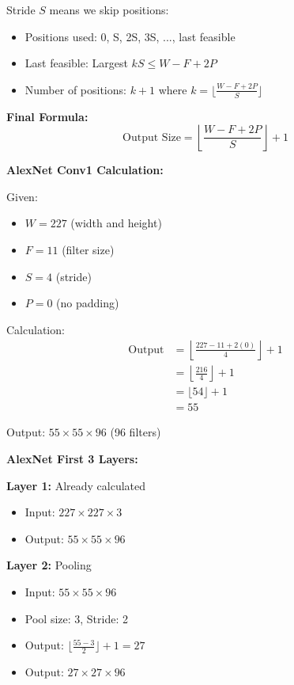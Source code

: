 \documentclass[12pt]{article}
\newcommand{\explanation}[1]{{\color{explanationcolor}#1}}
\begin{document}
\begin{enumerate}[(a)]
{    \explanation{
    Stride $S$ means we skip positions:
    \begin{itemize}
        \item Positions used: 0, S, 2S, 3S, ..., last feasible
        \item Last feasible: Largest $kS \leq W - F + 2P$
        \item Number of positions: $k + 1$ where $k = \lfloor\frac{W - F + 2P}{S}\rfloor$
    \end{itemize}
    
    \textbf{Final Formula:}
    \[\boxed{\text{Output Size} = \left\lfloor\frac{W - F + 2P}{S}\right\rfloor + 1}\]
    }
    
    \textbf{AlexNet Conv1 Calculation:}
    
    \explanation{
    Given:
    \begin{itemize}
        \item $W = 227$ (width and height)
        \item $F = 11$ (filter size)
        \item $S = 4$ (stride)
        \item $P = 0$ (no padding)
    \end{itemize}
    
    Calculation:
    \begin{align}
    \text{Output} &= \left\lfloor\frac{227 - 11 + 2(0)}{4}\right\rfloor + 1\\
    &= \left\lfloor\frac{216}{4}\right\rfloor + 1\\
    &= \lfloor 54 \rfloor + 1\\
    &= 55
    \end{align}
    
    Output: $55 \times 55 \times 96$ (96 filters)
    }
    
    \textbf{AlexNet First 3 Layers:}
    
    \explanation{
    \textbf{Layer 1:} Already calculated
    \begin{itemize}
        \item Input: $227 \times 227 \times 3$
        \item Output: $55 \times 55 \times 96$
    \end{itemize}
    
    \textbf{Layer 2:} Pooling
    \begin{itemize}
        \item Input: $55 \times 55 \times 96$
        \item Pool size: 3, Stride: 2
        \item Output: $\lfloor\frac{55 - 3}{2}\rfloor + 1 = 27$
        \item Output: $27 \times 27 \times 96$
    \end{itemize}
    
}}
\end{enumerate}
\end{document}
